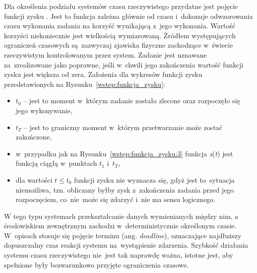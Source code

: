 Dla określenia podziału systemów czasu rzeczywistego przydatne jest pojęcie funkcji zysku \cite{rts}. Jest to funkcja zależna głównie od czasu i~dokonuje odwzorowania czasu wykonania zadania na korzyść wynikającą z~jego wykonania. Wartość korzyści niekoniecznie jest wielkością wymiarowaną. Źródłem występujących ograniczeń czasowych są~zazwyczaj zjawiska fizyczne zachodzące w~świecie rzeczywistym kontrolowanym przez system. Zadanie jest uznawane za~zrealizowane jako poprawne, jeśli w~chwili jego zakończenia wartość funkcji zysku jest większa od zera.
\clearpage
Założenia dla wykresów funkcji zysku przedstawionych na Rysunku~\ref{wstep:funkcja_zysku}:
\begin{itemize}
\item $t_0$ -- jest to moment w~którym zadanie zostało zlecone oraz rozpoczęło się jego wykonywanie,
\item $t_T$ -- jest to graniczny moment w~którym przetwarzanie może zostać zakończone,
\item w~przypadku jak na Rysunku~\ref{wstęp:funkcja_zysku:3} funkcja \textit{z}(\textit{t}) jest funkcją ciągłą w~punktach $t_1$ i~$t_T$,
\item dla wartości $t \leq t_0$ funkcji zysku nie wyznacza się, gdyż jest to~sytuacja niemożliwa, tzn. obliczany byłby zysk z~zakończenia zadania przed jego rozpoczęciem, co~nie~może się zdarzyć i~nie ma sensu logicznego.
\end{itemize}

W tego typu systemach przekształcanie danych wymienianych między nim, a środowiskiem zewnętrznym zachodzi w~deterministycznie określonym czasie. W~opisach stosuje się pojęcie terminu (ang. \textit{deadline})\cite{rts}, oznaczające najdłuższy dopuszczalny czas reakcji systemu na~wystąpienie zdarzenia. Szybkość działania systemu czasu rzeczywistego nie~jest tak naprawdę ważna, istotne jest, aby spełnione były bezwarunkowo przyjęte ograniczenia czasowe.

